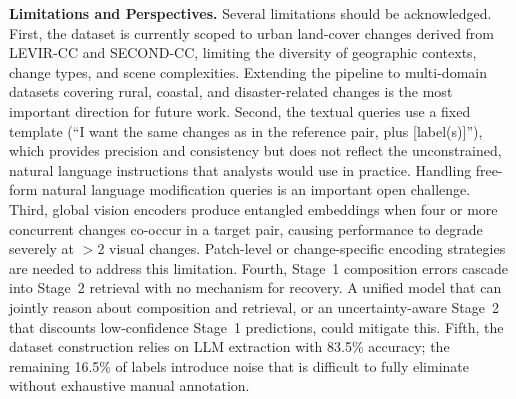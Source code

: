 \textbf{Limitations and Perspectives.}
Several limitations should be acknowledged.
First, the dataset is currently scoped to urban land-cover
changes derived from LEVIR-CC and SECOND-CC, limiting
the diversity of geographic contexts, change types, and
scene complexities. Extending the pipeline to multi-domain
datasets covering rural, coastal, and disaster-related
changes is the most important direction for future work.
Second, the textual queries use a fixed template (``I want
the same changes as in the reference pair, plus
[label(s)]''), which provides precision and consistency
but does not reflect the unconstrained, natural language
instructions that analysts would use in practice. Handling
free-form natural language modification queries is an
important open challenge.
Third, global vision encoders produce entangled embeddings
when four or more concurrent changes co-occur in a target
pair, causing performance to degrade severely at $>$2
visual changes. Patch-level or change-specific encoding
strategies are needed to address this limitation.
Fourth, Stage~1 composition errors cascade into Stage~2
retrieval with no mechanism for recovery. A unified model
that can jointly reason about composition and retrieval,
or an uncertainty-aware Stage~2 that discounts
low-confidence Stage~1 predictions, could mitigate this.
Fifth, the dataset construction relies on LLM extraction
with 83.5\% accuracy; the remaining 16.5\% of labels
introduce noise that is difficult to fully eliminate
without exhaustive manual annotation.
 
 